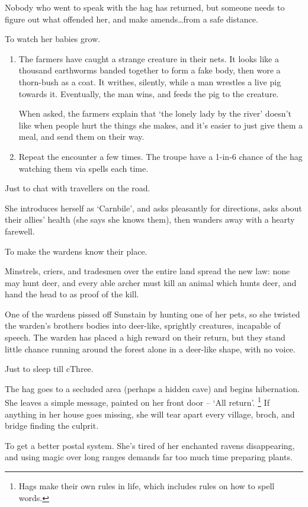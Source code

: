 \begin{multicols}{2}
\begin{dlist}
  Nobody who went to speak with the hag has returned, but someone needs to figure out what offended her, and make amends\ldots from a safe distance.
  \item
  To watch her babies grow.

  \begin{enumerate}
    \item
    The farmers have caught a strange creature in their nets.
    It looks like a thousand earthworms banded together to form a fake body, then wore a thorn-bush as a coat.
    It writhes, silently, while a man wrestles a live pig towards it.
    Eventually, the man wins, and feeds the pig to the creature.

    When asked, the farmers explain that `the lonely lady by the river' doesn't like when people hurt the things she makes, and it's easier to just give them a meal, and send them on their way.
    \item
    Repeat the encounter a few times.
    The troupe have a 1-in-6 chance of the hag watching them via spells each time.
  \end{enumerate}
  \item
  Just to chat with travellers on the road.

  She introduces herself as `Carnbile', and asks pleasantly for directions, asks about their allies' health (she says she knows them), then wanders away with a hearty farewell.
  \item
  To make the \glspl{warden} know their place.

  Minstrels, criers, and tradesmen over the entire land spread the new law: none may hunt deer, and every able archer must kill an animal which hunts deer, and hand the head to  as proof of the kill.

  One of the \glspl{warden} pissed off Sunstain by hunting one of her pets, so she twisted the \gls{warden}'s brothers bodies into deer-like, sprightly creatures, incapable of speech.
  The \gls{warden} has placed a high reward on their return, but they stand little chance running around the forest alone in a deer-like shape, with no voice.
  \item
  Just to sleep till \gls{cThree}.

  The hag goes to a secluded area (perhaps a hidden cave) and begins hibernation.
  She leaves a simple message, painted on her front door -- `{All return}'.%
  \footnote{Hags make their own rules in life, which includes rules on how to spell words.}
  If anything in her house goes missing, she will tear apart every \gls{village}, \gls{broch}, and bridge finding the culprit.
  \item
  To get a better postal system.
  She's tired of her enchanted ravens disappearing, and using magic over long ranges demands far too much time preparing plants.


\end{dlist}
\end{multicols}
